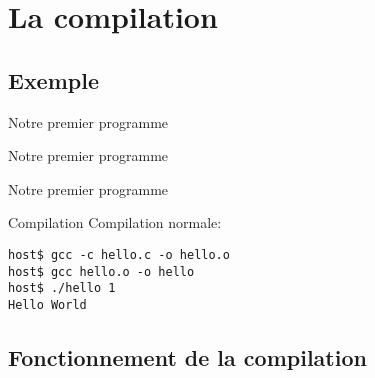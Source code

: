 %
%
%

\section{La compilation}

\subsection{Exemple}

\begin{frame}[fragile=singleslide]{Notre premier programme}{}
  
\end{frame}

\begin{frame}[fragile=singleslide]{Notre premier programme}{}
  
\end{frame}

\begin{frame}[fragile=singleslide]{Notre premier programme}{}
  
\end{frame}

\begin{frame}[fragile=singleslide]{Compilation}
  Compilation normale:
  \begin{lstlisting}
host$ gcc -c hello.c -o hello.o
host$ gcc hello.o -o hello
host$ ./hello 1
Hello World
  \end{lstlisting} %
\end{frame}

\subsection{Fonctionnement de la compilation}

